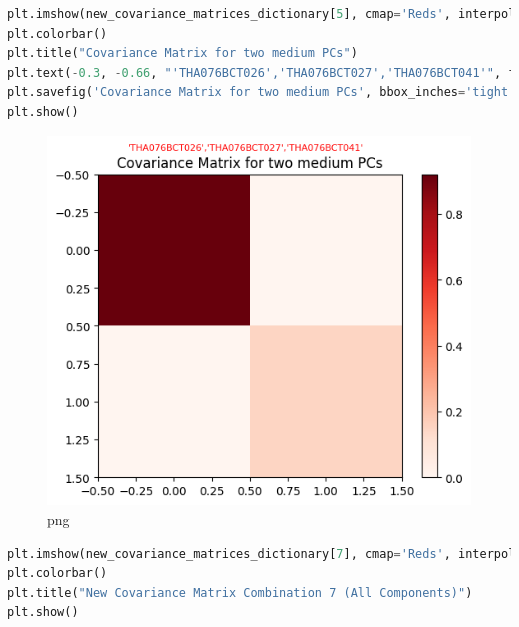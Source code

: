 \documentclass[
]{article}
\begin{document}
\begin{lstlisting}[language=Python]
plt.imshow(new_covariance_matrices_dictionary[5], cmap='Reds', interpolation='nearest')
plt.colorbar()
plt.title("Covariance Matrix for two medium PCs")
plt.text(-0.3, -0.66, "'THA076BCT026','THA076BCT027','THA076BCT041'", fontsize=8,color='red')
plt.savefig('Covariance Matrix for two medium PCs', bbox_inches='tight')
plt.show()
\end{lstlisting}

\begin{figure}
\centering
\includegraphics{PCA on IRIS_files/PCA on IRIS_44_0.png}
\caption{png}
\end{figure}

\begin{lstlisting}[language=Python]
plt.imshow(new_covariance_matrices_dictionary[7], cmap='Reds', interpolation='nearest')
plt.colorbar()
plt.title("New Covariance Matrix Combination 7 (All Components)")
plt.show()
\end{lstlisting}
\end{document}
